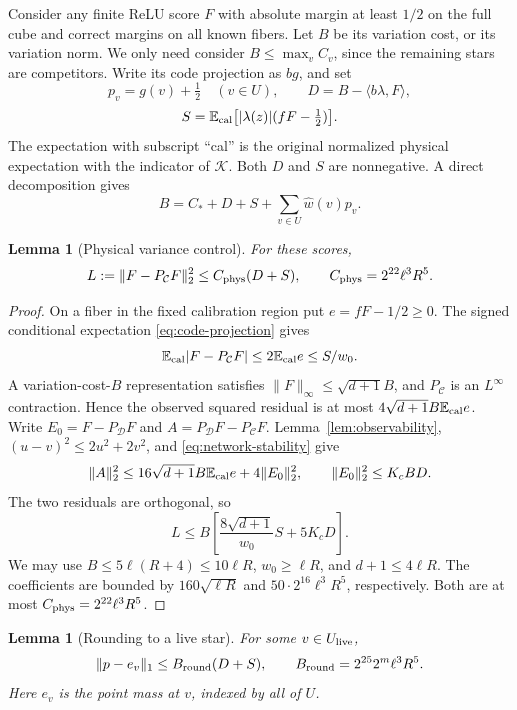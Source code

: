\documentclass[11pt]{article}
\newtheorem{lemma}[theorem]{Lemma}
\theoremstyle{remark}\newtheorem{remark}[theorem]{Remark}
\begin{document}
Consider any finite ReLU score $F$ with absolute margin at least $1/2$
on the full cube and correct margins on all known fibers. Let $B$ be its
variation cost, or its variation norm. We only need consider
$B\le\max_v C_v$, since the remaining stars are competitors. Write its
code projection as $bg$, and set
\[
 p_v=g(v)+\tfrac12\quad(v\in U),\qquad
 D=B-\langle b\lambda,F\rangle,
\]
\[
 S=\mathbb E_{\rm cal}\bigl[|\lambda(z)|(fF-\tfrac12)\bigr].
\]
The expectation with subscript ``cal'' is the original normalized
physical expectation with the indicator of $\mathcal K$. Both $D$ and
$S$ are nonnegative. A direct decomposition gives
\begin{equation}\label{eq:decomposition}
 B=C_*+D+S+\sum_{v\in U}\widehat w(v)p_v.
\end{equation}

\begin{lemma}[Physical variance control]\label{lem:variance}
For these scores,
\begin{equation}\label{eq:variance}
 L:=\|F-P_{\mathcal C}F\|_2^2
 \le C_{\rm phys}(D+S),\qquad C_{\rm phys}=2^{22}\ell^3R^5.
\end{equation}
\end{lemma}

\begin{proof}
On a fiber in the fixed calibration region put $e=fF-1/2\ge0$.
The signed conditional expectation \eqref{eq:code-projection} gives
\[
 \mathbb E_{\rm cal}|F-P_{\mathcal C}F|\le2\mathbb E_{\rm cal}e\le S/w_0.
\]
A variation-cost-$B$ representation satisfies
$\|F\|_\infty\le\sqrt{d+1}B$, and $P_{\mathcal C}$ is an
$L^\infty$ contraction. Hence the observed squared residual is at most
$4\sqrt{d+1}B\mathbb E_{\rm cal}e$.
Write $E_0=F-P_{\mathcal D}F$ and
$A=P_{\mathcal D}F-P_{\mathcal C}F$.
Lemma~\ref{lem:observability}, $(u-v)^2\le2u^2+2v^2$, and
\eqref{eq:network-stability} give
\[
 \|A\|_2^2\le16\sqrt{d+1}B\mathbb E_{\rm cal}e+4\|E_0\|_2^2,
 \qquad \|E_0\|_2^2\le K_cBD.
\]
The two residuals are orthogonal, so
\[
 L\le B\left[\frac{8\sqrt{d+1}}{w_0}S+5K_cD\right].
\]
We may use $B\le5\ell(R+4)\le10\ell R$, $w_0\ge\ell R$,
and $d+1\le4\ell R$. The coefficients are bounded by
$160\sqrt{\ell R}$ and $50\cdot2^{16}\ell^3R^5$, respectively.
Both are at most $C_{\rm phys}=2^{22}\ell^3R^5$.
\end{proof}

\begin{lemma}[Rounding to a live star]\label{lem:rounding}
For some $v\in U_{\rm live}$,
\begin{equation}\label{eq:rounding}
 \|p-e_v\|_1\le B_{\rm round}(D+S),\qquad
 B_{\rm round}=2^{25}2^m\ell^3R^5.
\end{equation}
Here $e_v$ is the point mass at $v$, indexed by all of $U$.
\end{lemma}
\end{document}
